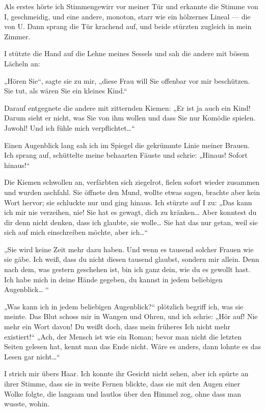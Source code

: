 Als erstes hörte ich Stimmengewirr vor meiner Tür und erkannte die
Stimme von I, geschmeidig, und eine andere, monoton, starr wie ein
hölzernes Lineal — die von U. Dann sprang die Tür krachend auf, und
beide stürzten zugleich in mein Zimmer.

I stützte die Hand auf die Lehne meines Sessels und sah die andere
mit bösem Lächeln an:

„Hören Sie“, sagte sie zu mir, „diese Frau will Sie offenbar vor
mir beschützen. Sie tut, als wären Sie ein kleines Kind.“

Darauf entgegnete die andere mit zitternden Kiemen: „Er ist ja auch
ein Kind! Darum sieht er nicht, was Sie von ihm wollen und dass Sie
nur Komödie spielen. Jawohl! Und ich fühle mich verpflichtet\ldots{}“

Einen Augenblick lang sah ich im Spiegel die gekrümmte Linie meiner
Brauen. Ich sprang auf, schüttelte meine behaarten Fäuste und
schrie: „Hinaus! Sofort hinaus!“

Die Kiemen schwollen an, verfärbten sich ziegelrot, fielen sofort
wieder zusammen und wurden aschfahl. Sie öffnete den Mund, wollte
etwas sagen, brachte aber kein Wort hervor; sie schluckte nur und
ging hinaus. Ich stürzte auf I zu: „Das kann ich mir nie verzeihen,
nie! Sie hat es gewagt, dich zu kränken\ldots{} Aber konntest du dir
denn nicht denken, dass ich glaubte, sie wolle\ldots{} Sie hat das nur
getan, weil sie sich auf mich einschreiben möchte, aber ich\ldots{}“

„Sie wird keine Zeit mehr dazu haben. Und wenn es tausend solcher
Frauen wie sie gäbe. Ich weiß, dass du nicht diesen tausend
glaubst, sondern mir allein. Denn nach dem, was gestern geschehen
ist, bin ich ganz dein, wie du es gewollt hast. Ich habe mich in
deine Hände gegeben, du kannst in jedem beliebigen Augenblick\ldots{} “

„Was kann ich in jedem beliebigen Augenblick?“ plötzlich begriff
ich, was sie meinte. Das Blut schoss mir in Wangen und Ohren, und
ich schrie: „Hör auf! Nie mehr ein Wort davon! Du weißt doch, dass
mein früheres Ich nicht mehr existiert!“ „Ach, der Mensch ist wie
ein Roman; bevor man nicht die letzten Seiten gelesen hat, kennt
man das Ende nicht. Wäre es anders, dann lohnte es das Lesen gar
nicht\ldots{}“

I strich mir übers Haar. Ich konnte ihr Gesicht nicht sehen, aber
ich spürte an ihrer Stimme, dass sie in weite Fernen blickte, dass
sie mit den Augen einer Wolke folgte, die langsam und lautlos über
den Himmel zog, ohne dass man wusste, wohin.

